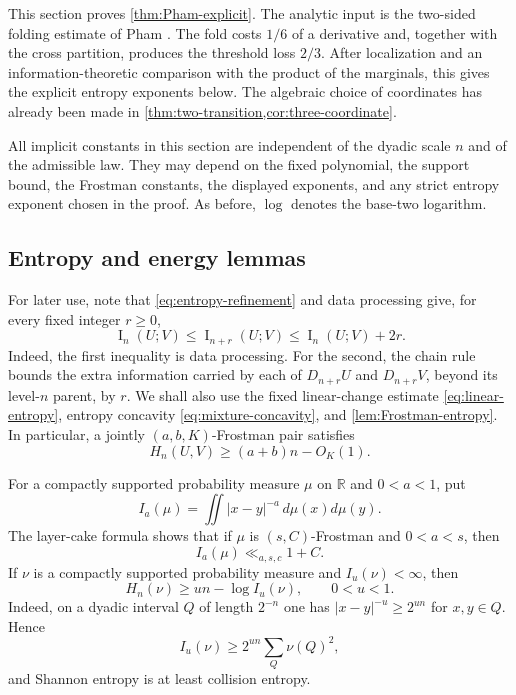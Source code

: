 \documentclass[11pt]{article}
\begin{document}
This section proves \cref{thm:Pham-explicit}.  The analytic input is the
two-sided folding estimate of Pham \cite{PhamFIO}.  The fold costs
\(1/6\) of a derivative and, together with the cross partition,
produces the threshold loss \(2/3\).  After localization and an
information-theoretic comparison with the product of the marginals,
this gives the explicit
entropy exponents below.  The algebraic choice of coordinates has
already been made in \cref{thm:two-transition,cor:three-coordinate}.

All implicit constants in this section are independent of the dyadic
scale \(n\) and of the admissible law.  They may depend on the fixed
polynomial, the support bound, the Frostman constants, the displayed
exponents, and any strict entropy exponent chosen in the proof.  As before, \(\log\) denotes the base-two logarithm.

\subsection{Entropy and energy lemmas}

For later use, note that \eqref{eq:entropy-refinement} and data
processing give, for every fixed integer \(r\geq0\),
\begin{equation}
 \operatorname{I}_n(U;V)\leq \operatorname{I}_{n+r}(U;V)
 \leq \operatorname{I}_n(U;V)+2r.
 \label{eq:Pham-information-refinement}
\end{equation}
Indeed, the first inequality is data processing.  For the second,
the chain rule bounds the extra information carried by each of
\(D_{n+r}U\) and \(D_{n+r}V\), beyond its level-\(n\) parent, by
\(r\).  We shall also use the fixed linear-change estimate
\eqref{eq:linear-entropy}, entropy concavity
\eqref{eq:mixture-concavity}, and \cref{lem:Frostman-entropy}.  In
particular, a jointly \((a,b,K)\)-Frostman pair satisfies
\begin{equation}
 H_n(U,V)\geq(a+b)n-O_K(1).
 \label{eq:Pham-joint-entropy-lower}
\end{equation}

For a compactly supported probability measure \(\mu\) on \(\mathbb R\)
and $0<a<1$, put
\[
 I_a(\mu)=\iint |x-y|^{-a}\,d\mu(x)d\mu(y).
\]
The layer-cake formula shows that if $\mu$ is $(s,C)$-Frostman and
$0<a<s$, then
\begin{equation}
 I_a(\mu)\ll_{a,s,c}1+C.
 \label{eq_pham_input_energy}
\end{equation}
If $\nu$ is a compactly supported probability measure and
$I_u(\nu)<\infty$, then
\begin{equation}
 H_n(\nu)\geq u n-\log I_u(\nu),\qquad 0<u<1.
 \label{eq_pham_energy_entropy}
\end{equation}
Indeed, on a dyadic interval $Q$ of length $2^{-n}$ one has
$|x-y|^{-u}\geq2^{un}$ for $x,y\in Q$.  Hence
\[
 I_u(\nu)\geq2^{un}\sum_Q\nu(Q)^2,
\]
and Shannon entropy is at least collision entropy.
\end{document}
